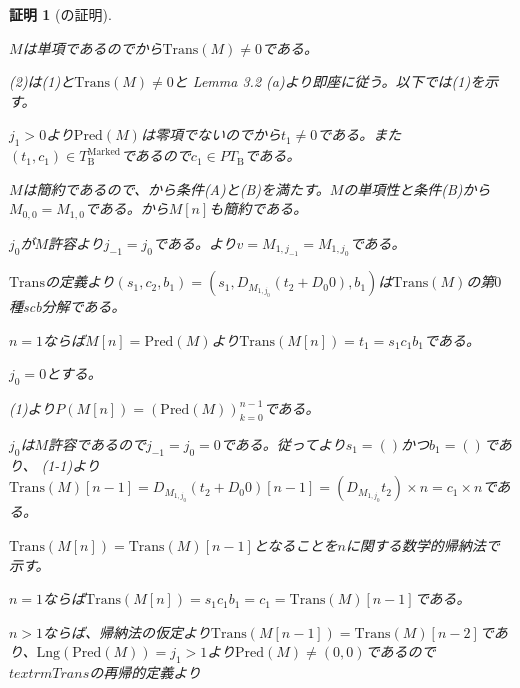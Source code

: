 \documentclass[dvipdfmx,uplatex]{jsarticle}
\theoremstyle{customnonumberbreakfortheorem}
\theoremstyle{customnonumberbreakforproof}
\newtheorem{hideableproof}{証明}
\begin{document}
\begin{hideableproof}[の証明]
	\begin{indented}
		\item \(M\)は単項であるのでから\(\textrm{Trans}(M) \neq 0\)である。
		\item (2)は(1)と\(\textrm{Trans}(M) \neq 0\)と\cite{buc1} Lemma 3.2 (a)より即座に従う。以下では(1)を示す。
		\item \(j_1 > 0\)より\(\textrm{Pred}(M)\)は零項でないのでから\(t_1 \neq 0\)である。また\((t_1,c_1) \in T_{\textrm{B}}^{\textrm{Marked}}\)であるので\(c_1 \in PT_{\textrm{B}}\)である。
		\item \(M\)は簡約であるので、から条件(A)と(B)を満たす。\(M\)の単項性と条件(B)から\(M_{0,0} = M_{1,0}\)である。から\(M[n]\)も簡約である。
		\item \(j_0\)が\(M\)許容より\(j_{-1} = j_0\)である。より\(v = M_{1,j_{-1}} = M_{1,j_0}\)である。
		\item \(\textrm{Trans}\)の定義より\((s_1,c_2,b_1) = (s_1,D_{M_{1,j_0}}(t_2 + D_0 0), b_1)\)は\(\textrm{Trans}(M)\)の第\(0\)種scb分解である。
		\item \(n = 1\)ならば\(M[n] = \textrm{Pred}(M)\)より\(\textrm{Trans}(M[n]) = t_1 = s_1 c_1 b_1\)である。
		\item
		\item \(j_0 = 0\)とする。
		\begin{indented}
			\item {} (1)より\(P(M[n]) = (\textrm{Pred}(M))_{k=0}^{n-1}\)である。
			\item \(j_0\)は\(M\)許容であるので\(j_{-1} = j_0 = 0\)である。従ってより\(s_1 = ()\)かつ\(b_1 = ()\)であり、 (1-1)より\(\textrm{Trans}(M)[n-1] = D_{M_{1,j_0}}(t_2 + D_0 0)[n-1] = (D_{M_{1,j_0}} t_2) \times n  = c_1 \times n\)である。
			\item \(\textrm{Trans}(M[n]) = \textrm{Trans}(M)[n-1]\)となることを\(n\)に関する数学的帰納法で示す。
			\begin{indented}
				\item \(n = 1\)ならば\(\textrm{Trans}(M[n]) = s_1 c_1 b_1 =  c_1 = \textrm{Trans}(M)[n-1]\)である。
				\item \(n > 1\)ならば、帰納法の仮定より\(\textrm{Trans}(M[n-1]) = \textrm{Trans}(M)[n-2]\)であり、\(\textrm{Lng}(\textrm{Pred}(M)) = j_1 > 1\)より\(\textrm{Pred}(M) \neq (0,0)\)であるので\(textrm{Trans}\)の再帰的定義より

\end{indented}
\end{indented}
\end{indented}
\end{hideableproof}
\end{document}
